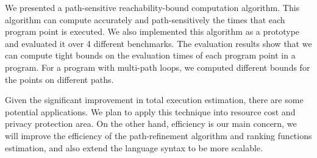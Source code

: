 We presented a path-sensitive reachability-bound computation algorithm.
This algorithm can compute accurately and path-sensitively the times that each program point is executed.
We also implemented this algorithm as a prototype and evaluated it over 4 different benchmarks.
The evaluation results show that we can compute tight bounds on the evaluation times of each program point in a program. For a program with multi-path loops, we computed different bounds for the points on different paths.

Given the significant improvement in total execution estimation, there are some potential applications.
We plan to apply this technique into resource cost and privacy protection area.
On the other hand, efficiency is our main concern, we will improve the efficiency of the path-refinement algorithm and ranking functions estimation, and also extend the language syntax
to be more scalable.